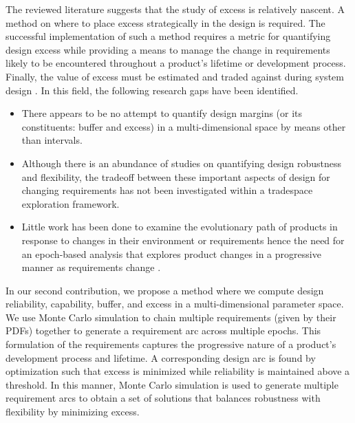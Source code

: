 
The reviewed literature suggests that the study of excess is relatively nascent. A method on where to place excess strategically in the design is required. The successful implementation of such a method requires a metric for quantifying  design excess while providing a means to manage the change in requirements likely to be encountered throughout a product's lifetime or development process. Finally, the value of excess must be estimated and traded against during system design \cite{Long2017}. In this field, the following research gaps have been identified.

\begin{itemize}
	\item There appears to be no attempt to quantify design margins (or its constituents: buffer and excess) in a multi-dimensional space by means other than intervals. 
	\item Although there is an abundance of studies on quantifying design robustness and flexibility, the tradeoff between these important aspects of design for changing requirements has not been investigated within a tradespace exploration framework. 
	\item Little work has been done to examine the evolutionary path of products in response to changes in their environment or requirements hence the need for an epoch-based analysis that explores product changes in a progressive manner as requirements change \cite{Long2017,Cardin2017}.
\end{itemize}

In our second contribution, we propose a method where we compute design reliability, capability, buffer, and excess  in a multi-dimensional parameter space. We use Monte Carlo simulation to chain multiple requirements (given by their \acp{PDF}) together to generate a requirement arc across multiple epochs. This formulation of the requirements captures the progressive nature of a product's development process and lifetime. A corresponding design arc is found by optimization such that excess is minimized while reliability is maintained above a threshold. In this manner, Monte Carlo simulation is used to generate multiple requirement arcs to obtain a set of solutions that balances robustness with flexibility by minimizing excess.

